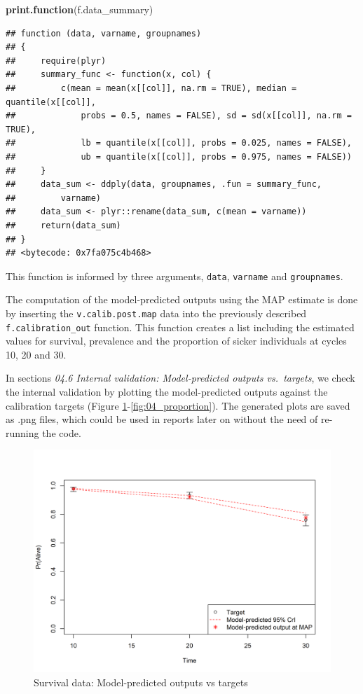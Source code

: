 \documentclass[]{article}
\newenvironment{Shaded}{\begin{snugshade}}{\end{snugshade}}
\newcommand{\KeywordTok}[1]{\textcolor[rgb]{0.13,0.29,0.53}{\textbf{#1}}}
\newcommand{\NormalTok}[1]{#1}
\begin{document}
\begin{Shaded}
\begin{Highlighting}[]
\KeywordTok{print.function}\NormalTok{(f.data_summary)}
\end{Highlighting}
\end{Shaded}

\begin{verbatim}
## function (data, varname, groupnames) 
## {
##     require(plyr)
##     summary_func <- function(x, col) {
##         c(mean = mean(x[[col]], na.rm = TRUE), median = quantile(x[[col]], 
##             probs = 0.5, names = FALSE), sd = sd(x[[col]], na.rm = TRUE), 
##             lb = quantile(x[[col]], probs = 0.025, names = FALSE), 
##             ub = quantile(x[[col]], probs = 0.975, names = FALSE))
##     }
##     data_sum <- ddply(data, groupnames, .fun = summary_func, 
##         varname)
##     data_sum <- plyr::rename(data_sum, c(mean = varname))
##     return(data_sum)
## }
## <bytecode: 0x7fa075c4b468>
\end{verbatim}

This function is informed by three arguments, \texttt{data},
\texttt{varname} and \texttt{groupnames}.

The computation of the model-predicted outputs using the MAP estimate is
done by inserting the \texttt{v.calib.post.map} data into the previously
described \texttt{f.calibration\_out} function. This function creates a
list including the estimated values for survival, prevalence and the
proportion of sicker individuals at cycles 10, 20 and 30.

In sections \emph{04.6 Internal validation: Model-predicted outputs
vs.~targets}, we check the internal validation by plotting the
model-predicted outputs against the calibration targets (Figure
\ref{fig:04_surv}-\ref{fig:04_proportion}). The generated plots are
saved as .png files, which could be used in reports later on without the
need of re-running the code.

\begin{figure}
\centering
\includegraphics{../figs/04_posterior-vs-targets-survival.png}
\caption{Survival data: Model-predicted outputs vs targets
\label{fig:04_surv}}
\end{figure}
\end{document}

